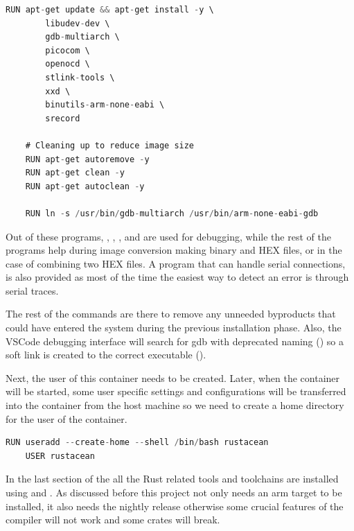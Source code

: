 \begin{lstlisting}[language=C,frame=single,float=!ht,label={lst:docker-apt},caption={Installing External Dependencies}]
    RUN apt-get update && apt-get install -y \
        libudev-dev \
        gdb-multiarch \
        picocom \
        openocd \
        stlink-tools \
        xxd \
        binutils-arm-none-eabi \
        srecord

    # Cleaning up to reduce image size
    RUN apt-get autoremove -y
    RUN apt-get clean -y
    RUN apt-get autoclean -y

    RUN ln -s /usr/bin/gdb-multiarch /usr/bin/arm-none-eabi-gdb
\end{lstlisting}

Out of these programs, , , , and  are used for debugging, while the rest of the programs help during image conversion making binary and HEX files, or in the case of  combining two HEX files. A program that can handle serial connections,  is also provided as most of the time the easiest way to detect an error is through serial traces.

The rest of the  commands are there to remove any unneeded byproducts that could have entered the system during the previous installation phase. Also, the VSCode debugging interface will search for gdb with deprecated naming () so a soft link is created to the correct executable ().

Next, the user of this container needs to be created. Later, when the container will be started, some user specific settings and configurations will be transferred into the container from the host machine so we need to create a home directory for the user of the container.

\begin{lstlisting}[language=C,frame=single,float=!ht,label={lst:docker-user},caption={Creating a User for the Container}]
    RUN useradd --create-home --shell /bin/bash rustacean
    USER rustacean
\end{lstlisting}

In the last section of the  all the Rust related tools and toolchains are installed using  and . As discussed before this project not only needs an arm target to be installed, it also needs the nightly release otherwise some crucial features of the compiler will not work and some crates will break.

